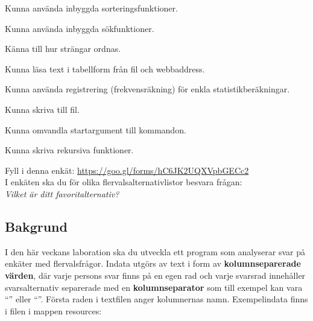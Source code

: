 

\Lab{\LabWeekTEN}

\begin{Goals}
\item Kunna använda inbyggda sorteringsfunktioner.
\item Kunna använda inbyggda sökfunktioner.
\item Känna till hur strängar ordnas.
\item Kunna läsa text i tabellform från fil och webbaddress.
\item Kunna använda registrering (frekvensräkning) för enkla statistikberäkningar.
\item Kunna skriva till fil.
\item Kunna omvandla startargument till kommandon.
\item Kunna skriva rekursiva funktioner.
\end{Goals}

\begin{Preparations}
\item {}
\item {}
\item \ReadTheLab
\item Fyll i denna enkät: \url{https://goo.gl/forms/hC6JK2UQXVpbGECc2}  \\
I enkäten ska du för olika flervalsalternativlistor besvara frågan: \\ \textit{Vilket är ditt favoritalternativ?}
\end{Preparations}


\subsection{Bakgrund}

I den här veckans laboration ska du utveckla ett program som analyserar svar på enkäter med flervalsfrågor. Indata utgörs av text i form av \textbf{kolumnseparerade värden}, där varje persons svar finns på en egen rad och varje svarsrad innehåller svarsalternativ separerade med en \textbf{kolumnseparator} som till exempel kan vara ``\code{\t}'' eller ``\code{,}''. Första raden i textfilen anger kolumnernas namn.
Exempelindata finns i filen  i mappen resources:


